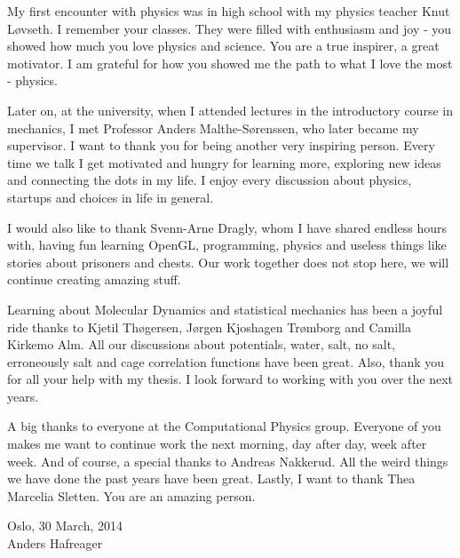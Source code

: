 My first encounter with physics was in high school with my physics teacher Knut L{\o}vseth. I remember your classes. They were filled with enthusiasm and joy - you showed how much you love physics and science. You are a true inspirer, a great motivator. I am grateful for how you showed me the path to what I love the most - physics.

Later on, at the university, when I attended lectures in the introductory course in mechanics, I met Professor Anders Malthe-S{\o}renssen, who later became my supervisor. I want to thank you for being another very inspiring person. Every time we talk I get motivated and hungry for learning more, exploring new ideas and connecting the dots in my life. I enjoy every discussion about physics, startups and choices in life in general. 

I would also like to thank Svenn-Arne Dragly, whom I have shared endless hours with, having fun learning OpenGL, programming, physics and useless things like stories about prisoners and chests. Our work together does not stop here, we will continue creating amazing stuff.

Learning about Molecular Dynamics and statistical mechanics has been a joyful ride thanks to Kjetil Th{\o}gersen, J{\o}rgen Kjoshagen Tr{\o}mborg and Camilla Kirkemo Alm. All our discussions about potentials, water, salt, no salt, erroneously salt and cage correlation functions have been great. Also, thank you for all your help with my thesis. I look forward to working with you over the next years.

A big thanks to everyone at the Computational Physics group. Everyone of you makes me want to continue work the next morning, day after day, week after week. And of course, a special thanks to Andreas Nakkerud. All the weird things we have done the past years have been great. Lastly, I want to thank Thea Marcelia Sletten. You are an amazing person.

\raggedleft Oslo, 30 March, 2014\\
\raggedleft Anders Hafreager